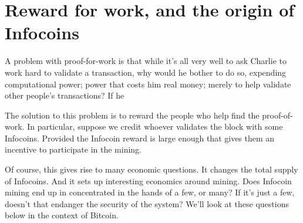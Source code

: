 \documentclass[12pt]{book}
\newcounter{problem}[chapter]
\begin{document}
\section{Reward for work, and the origin of Infocoins}

A problem with proof-for-work is that while it's all very well to ask
Charlie to work hard to validate a transaction, why would he bother to
do so, expending computational power; power that costs him real money;
merely to help validate other people's transactions?  If he

The solution to this problem is to reward the people who help find the
proof-of-work.  In particular, suppose we credit whoever validates the
block with some Infocoins.  Provided the Infocoin reward is large
enough that gives them an incentive to participate in the mining.

Of course, this gives rise to many economic questions.  It changes the
total supply of Infocoins.  And it sets up interesting economics
around mining.  Does Infocoin mining end up in concentrated in the
hands of a few, or many?  If it's just a few, doesn't that endanger
the security of the system?  We'll look at these questions below in
the context of Bitcoin.  
\end{document}
